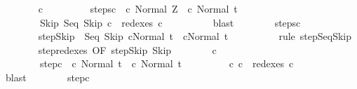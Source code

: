 \begin{isabellebody}
\ \ \ \ \ \ \isamarkupfalse%
\ c{\isacharprime}{\isacharprime}\ \isanewline
\ \ \ \ \ \ \ \ steps{\isacharunderscore}c{\isacharprime}{\isacharprime}{\isacharcolon}\ {\isachardoublequoteopen}{\isasymGamma}{\isasymturnstile}\ {\isacharparenleft}c{\isacharprime}{\isacharcomma}\ Normal\ Z{\isacharparenright}\ {\isasymrightarrow}\isactrlsup {\isacharasterisk}\ {\isacharparenleft}c{\isacharprime}{\isacharprime}{\isacharcomma}\ Normal\ t{\isacharparenright}{\isachardoublequoteclose}\ \isanewline
\ \ \ \ \ \ \ \ Skip{\isacharcolon}\ {\isachardoublequoteopen}Seq\ Skip\ c{}\ {\isasymin}\ redexes\ c{\isacharprime}{\isacharprime}{\isachardoublequoteclose}\isanewline
\ \ \ \ \ \ \ \ \isamarkupfalse%
\ blast\isanewline
\ \ \ \ \ \ \isamarkupfalse%
\ steps{\isacharunderscore}c{\isacharprime}{\isacharprime}\isanewline
\ \ \ \ \ \ \isamarkupfalse%
\ \isanewline
\ \ \ \ \ \ \isamarkupfalse%
\ step{\isacharunderscore}Skip{\isacharcolon}\ {\isachardoublequoteopen}{\isasymGamma}{\isasymturnstile}\ {\isacharparenleft}Seq\ Skip\ c{}{\isacharcomma}Normal\ t{\isacharparenright}\ {\isasymrightarrow}\ {\isacharparenleft}c{}{\isacharcomma}Normal\ t{\isacharparenright}{\isachardoublequoteclose}\isanewline
\ \ \ \ \ \ \ \ \isamarkupfalse%
\ {\isacharparenleft}rule\ step{\isachardot}SeqSkip{\isacharparenright}\isanewline
\ \ \ \ \ \ \isamarkupfalse%
\ step{\isacharunderscore}redexes\ {\isacharbrackleft}OF\ step{\isacharunderscore}Skip\ Skip{\isacharbrackright}\isanewline
\ \ \ \ \ \ \isamarkupfalse%
\ c{\isacharprime}{\isacharprime}{\isacharprime}\ \isanewline
\ \ \ \ \ \ \ \ step{\isacharunderscore}c{\isacharprime}{\isacharprime}{\isacharprime}{\isacharcolon}\ {\isachardoublequoteopen}{\isasymGamma}{\isasymturnstile}\ {\isacharparenleft}c{\isacharprime}{\isacharprime}{\isacharcomma}\ Normal\ t{\isacharparenright}\ {\isasymrightarrow}\ {\isacharparenleft}c{\isacharprime}{\isacharprime}{\isacharprime}{\isacharcomma}\ Normal\ t{\isacharparenright}{\isachardoublequoteclose}\ \isanewline
\ \ \ \ \ \ \ \ c{}{\isacharcolon}\ {\isachardoublequoteopen}c{}\ {\isasymin}\ redexes\ c{\isacharprime}{\isacharprime}{\isacharprime}{\isachardoublequoteclose}\isanewline
\ \ \ \ \ \ \ \ \isamarkupfalse%
\ blast\isanewline
\ \ \ \ \ \ \isamarkupfalse%
\ step{\isacharunderscore}c{\isacharprime}{\isacharprime}{\isacharprime}\isanewline

\end{isabellebody}
